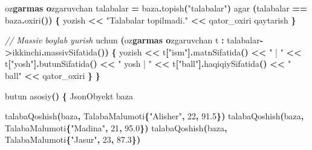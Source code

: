 \documentclass[a4paper,11pt,twoside,openright]{book}
\newenvironment{Shaded}{\begin{snugshade}}{\end{snugshade}}
\newcommand{\CharTok}[1]{\textcolor[rgb]{0.31,0.60,0.02}{#1}}
\newcommand{\CommentTok}[1]{\textcolor[rgb]{0.56,0.35,0.01}{\textit{#1}}}
\newcommand{\DecValTok}[1]{\textcolor[rgb]{0.00,0.00,0.81}{#1}}
\newcommand{\ErrorTok}[1]{\textcolor[rgb]{0.64,0.00,0.00}{\textbf{#1}}}
\newcommand{\FloatTok}[1]{\textcolor[rgb]{0.00,0.00,0.81}{#1}}
\newcommand{\NormalTok}[1]{#1}
\newcommand{\OperatorTok}[1]{\textcolor[rgb]{0.81,0.36,0.00}{\textbf{#1}}}
\newcommand{\StringTok}[1]{\textcolor[rgb]{0.31,0.60,0.02}{#1}}
\begin{document}
\begin{Shaded}
\begin{Highlighting}[]
\NormalTok{    o}\CharTok{\textquotesingle{}z}\ErrorTok{garmas o}\CharTok{\textquotesingle{}}\NormalTok{zgaruvchan talabalar }\OperatorTok{=}\NormalTok{ baza}\OperatorTok{.}\NormalTok{topish}\OperatorTok{(}\StringTok{"talabalar"}\OperatorTok{)}
\NormalTok{    agar }\OperatorTok{(}\NormalTok{talabalar }\OperatorTok{==}\NormalTok{ baza}\OperatorTok{.}\NormalTok{oxiri}\OperatorTok{())} \OperatorTok{\{}
\NormalTok{        yozish }\OperatorTok{\textless{}\textless{}} \StringTok{"Talabalar topilmadi."} \OperatorTok{\textless{}\textless{}}\NormalTok{ qator\_oxiri}
\NormalTok{        qaytarish}
    \OperatorTok{\}}

    \CommentTok{// Massiv bo\textquotesingle{}ylab yurish}
\NormalTok{    uchun }\OperatorTok{(}\NormalTok{o}\CharTok{\textquotesingle{}z}\ErrorTok{garmas o}\CharTok{\textquotesingle{}}\NormalTok{zgaruvchan t }\OperatorTok{:}\NormalTok{ talabalar}\OperatorTok{{-}\textgreater{}}\NormalTok{ikkinchi}\OperatorTok{.}\NormalTok{massivSifatida}\OperatorTok{())} \OperatorTok{\{}
\NormalTok{        yozish }\OperatorTok{\textless{}\textless{}}\NormalTok{ t}\OperatorTok{[}\StringTok{"ism"}\OperatorTok{].}\NormalTok{matnSifatida}\OperatorTok{()} \OperatorTok{\textless{}\textless{}} \StringTok{" | "}
               \OperatorTok{\textless{}\textless{}}\NormalTok{ t}\OperatorTok{[}\StringTok{"yosh"}\OperatorTok{].}\NormalTok{butunSifatida}\OperatorTok{()} \OperatorTok{\textless{}\textless{}} \StringTok{" yosh | "}
               \OperatorTok{\textless{}\textless{}}\NormalTok{ t}\OperatorTok{[}\StringTok{"ball"}\OperatorTok{].}\NormalTok{haqiqiySifatida}\OperatorTok{()} \OperatorTok{\textless{}\textless{}} \StringTok{" ball"} \OperatorTok{\textless{}\textless{}}\NormalTok{ qator\_oxiri}
    \OperatorTok{\}}
\OperatorTok{\}}

\NormalTok{butun asosiy}\OperatorTok{()} \OperatorTok{\{}
\NormalTok{    JsonObyekt baza}

\NormalTok{    talabaQoshish}\OperatorTok{(}\NormalTok{baza}\OperatorTok{,}\NormalTok{ TalabaMalumoti}\OperatorTok{\{}\StringTok{"Alisher"}\OperatorTok{,} \DecValTok{22}\OperatorTok{,} \FloatTok{91.5}\OperatorTok{\})}
\NormalTok{    talabaQoshish}\OperatorTok{(}\NormalTok{baza}\OperatorTok{,}\NormalTok{ TalabaMalumoti}\OperatorTok{\{}\StringTok{"Madina"}\OperatorTok{,} \DecValTok{21}\OperatorTok{,} \FloatTok{95.0}\OperatorTok{\})}
\NormalTok{    talabaQoshish}\OperatorTok{(}\NormalTok{baza}\OperatorTok{,}\NormalTok{ TalabaMalumoti}\OperatorTok{\{}\StringTok{"Jasur"}\OperatorTok{,} \DecValTok{23}\OperatorTok{,} \FloatTok{87.3}\OperatorTok{\})}


\end{Highlighting}
\end{Shaded}
\end{document}
